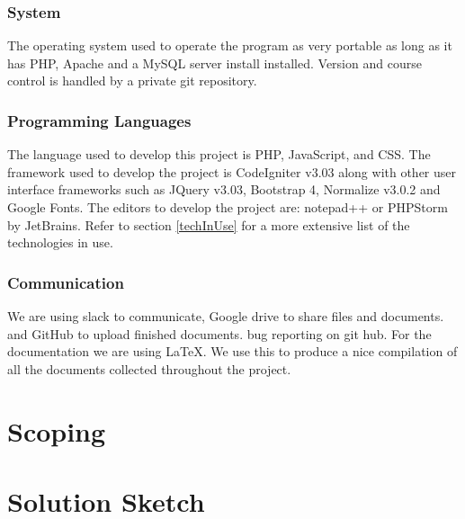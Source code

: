 \documentclass[12pt]{article}
\begin{document}
\subsubsection{System}

The operating system used to operate the program as very portable as long as it has PHP, Apache and a MySQL server install installed.  Version and course control is handled by a private git repository. 

\subsubsection{Programming Languages}
The language used to develop this project is PHP, JavaScript, and CSS. The framework used to develop the project is CodeIgniter v3.03 along with other user interface frameworks such as JQuery v3.03, Bootstrap  4, Normalize v3.0.2  and Google Fonts. The editors to develop the project are: notepad++ or PHPStorm by JetBrains. Refer to section \ref{techInUse} for a more extensive list of the technologies in use.

\subsubsection{Communication}

We are using slack to communicate, Google drive to share files and documents. and GitHub to upload finished documents. bug reporting on git hub. For the documentation we are using LaTeX. We use this to produce a nice compilation of all the documents collected throughout the project.  

\vfill
\newpage
\section{Scoping}

\vfill
\newpage
\section{Solution Sketch}
\end{document}

